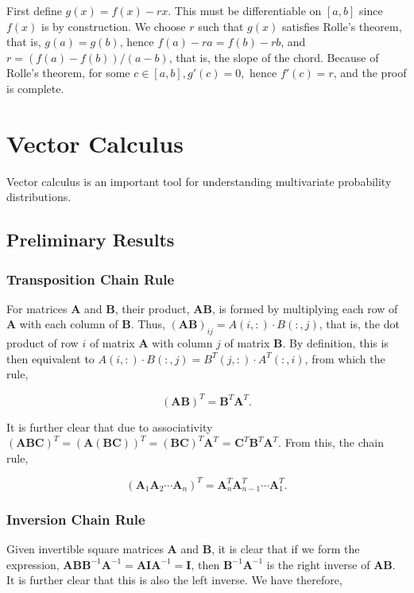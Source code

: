\documentclass[11pt]{amsart}
\begin{document}
First define $g(x) = f(x) - rx$. This must be differentiable on $[a, b]$ since $f(x)$ is by construction. We choose $r$ such that $g(x)$ satisfies Rolle's theorem, that is, $g(a) = g(b)$, hence $f(a) - ra = f(b) - rb$, and $r = (f(a) - f(b))/(a - b)$, that is, the slope of the chord. Because of Rolle's theorem, for some $c \in [a, b], g'(c) = 0,$ hence $f'(c) = r$, and the proof is complete.

\section{Vector Calculus}

Vector calculus is an important tool for understanding multivariate probability distributions.

\subsection{Preliminary Results}

\subsubsection{Transposition Chain Rule}

For matrices \textbf{A} and \textbf{B}, their product, \textbf{AB}, is formed by multiplying each row of \textbf{A} with each column of \textbf{B}. Thus, $(\textbf{AB})_{ij} = A(i, :) \cdot B(:, j)$, that is, the dot product of row $i$ of matrix \textbf{A} with column $j$ of matrix \textbf{B}. By definition, this is then equivalent to $A(i, :) \cdot B(:, j)= B^T(j, :) \cdot A^T(:,i)$, from which the rule,

$$(\mathbf{AB})^T = \mathbf{B}^T\mathbf{A}^T.$$

It is further clear that due to associativity $(\mathbf{ABC})^T = (\mathbf{A(BC)})^T = (\mathbf{BC})^T\mathbf{A}^T$ = $\mathbf{C}^T\mathbf{B}^T\mathbf{A}^T$. From this, the chain rule,

$$(\mathbf{A}_1\mathbf{A}_2\cdots \mathbf{A}_n)^T = \mathbf{A}_n^T\mathbf{A}_{n-1}^T\cdots\mathbf{A}_1^T.$$

\subsubsection{Inversion Chain Rule}

Given invertible square matrices \textbf{A} and \textbf{B}, it is clear that if we form the expression, $\mathbf{AB}\mathbf{B}^{-1}\mathbf{A}^{-1} = \mathbf{A}\mathbf{I}\mathbf{A}^{-1} = \mathbf{I}$, then $\mathbf{B}^{-1}\mathbf{A}^{-1}$ is the right inverse of $\mathbf{AB}$. It is further clear that this is also the left inverse. We have therefore,
\end{document}
